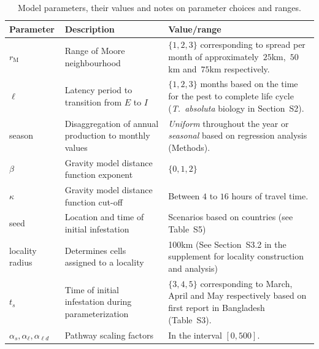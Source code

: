 \documentclass[11pt]{article}
\newcommand{\tuta}{\emph{T.~absoluta}}
\newcommand{\infest}{\rho}
\newcommand{\suitable}{\epsilon}
\newcommand{\asd}{\alpha_s}
\newcommand{\afm}{\alpha_{\ell}}
\newcommand{\ald}{\alpha_{\ell d}}
\newcommand{\mooreRange}{r_\mathrm{M}}
\theoremstyle{definition}
\begin{document}
\begin{table}[t]
\caption{Model parameters, their values and notes on parameter choices and
ranges.\label{tab:param}}
    \centering
	\small
{} %
    \begin{tabular}{p{}p{}p{}}
		\hline		
		Parameter & Description & Value/range \\
\hline		
\hline
$\mooreRange$ & Range of Moore neighbourhood & $\{1,2,3\}$ corresponding to
spread per month of 
approximately~$25$km,~$50$km and~$75$km
respectively. \\
$\ell$ & Latency period to transition from $E$ to $I$ & $\{1,2,3\}$ months
based on the time for the pest to complete life cycle (\tuta{} biology in
Section~S2). \\
season & Disaggregation of annual production to monthly values
& \emph{Uniform} throughout the year or \emph{seasonal} based on regression
analysis (Methods). \\
$\beta$ & Gravity model distance function exponent & $\{0,1,2\}$ \\
$\kappa$ & Gravity model distance function cut-off & Between $4$ to $16$ hours
of travel time. \\
seed & Location and time of initial infestation & Scenarios based on
countries (see Table~S5)\\
locality radius & Determines cells assigned to a locality & 100km (See
Section~S3.2 in the supplement for locality construction
and analysis) \\\hline
$t_s$ & Time of initial infestation during parameterization & $\{3,4,5\}$ corresponding
to March, April and May respectively based on first report in
Bangladesh (Table~S3). \\
$\asd,\afm,\ald$ & Pathway scaling factors & In the interval $[0,500]$.\\
\hline
\end{tabular}
\end{table}
\end{document}
